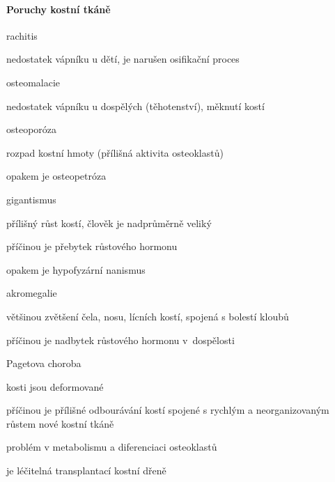 \documentclass[DIV=8]{scrreprt}
\begin{document}
\paragraph{Poruchy kostní tkáně}
\begin{myItemize}[nosep]
    \item rachitis
\begin{myItemize}[nosep]
    \item nedostatek vápníku u dětí, je narušen osifikační proces
\end{myItemize}

    \item osteomalacie
\begin{myItemize}[nosep]
    \item nedostatek vápníku u dospělých (těhotenství), měknutí kostí
\end{myItemize}

    \item osteoporóza
\begin{myItemize}[nosep]
    \item rozpad kostní hmoty (přílišná aktivita osteoklastů)
    \item opakem je osteopetróza
\end{myItemize}

    \item gigantismus
\begin{myItemize}[nosep]
    \item přílišný růst kostí, člověk je nadprůměrně veliký
    \item příčinou je přebytek růstového hormonu
    \item opakem je hypofyzární nanismus
\end{myItemize}

    \item akromegalie
\begin{myItemize}[nosep]
    \item většinou zvětšení čela, nosu, lícních kostí, spojená s bolestí kloubů
    \item příčinou je nadbytek růstového hormonu v dospělosti
\end{myItemize}

    \item Pagetova choroba
\begin{myItemize}[nosep]
    \item kosti jsou deformované
    \item příčinou je přílišné odbourávání kostí spojené s rychlým a neorganizovaným růstem nové kostní tkáně
\begin{myItemize}[nosep]
    \item problém v metabolismu a diferenciaci osteoklastů
\end{myItemize}

    \item je léčitelná transplantací kostní dřeně
\end{myItemize}

\end{myItemize}
\end{document}
